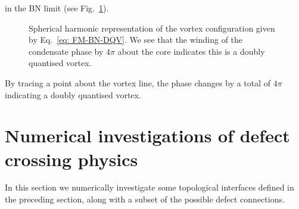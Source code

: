 in the BN limit (see Fig.~\ref{fig: BN-DQV}).
\begin{figure}
    \centering
    \caption[Spherical harmonic representation of a biaxial nematic doubly
        quantised vortex]
    {\label{fig: BN-DQV} Spherical harmonic
        representation of the vortex configuration given by
        Eq.~\eqref{eq: FM-BN-DQV}.
        We see that the winding of the condensate phase by \(4\pi \) about the
        core indicates this is a doubly quantised vortex.}
\end{figure}
By tracing a point about the vortex line, the phase changes by a total of
\(4\pi \) indicating a doubly quantised vortex.

\section{Numerical investigations of defect crossing physics}
In this section we numerically investigate some topological interfaces defined
in the preceding section, along with a subset of the possible defect
connections.

